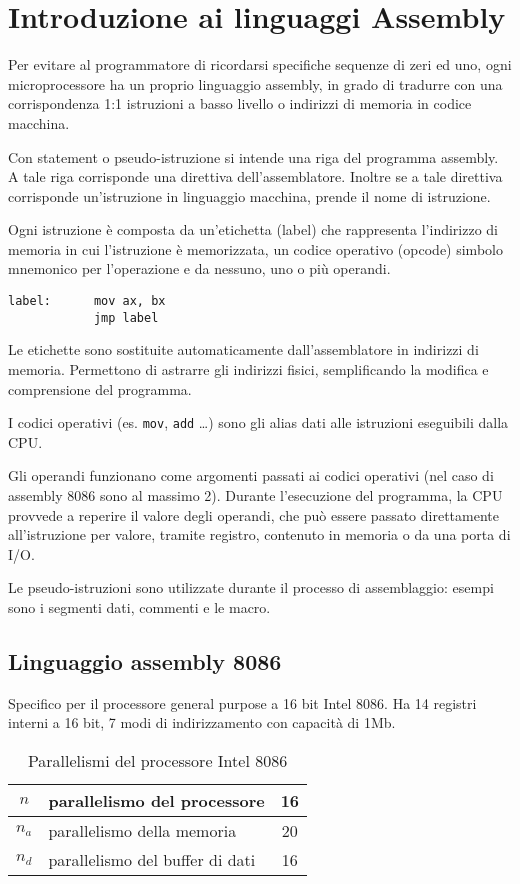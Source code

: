 \documentclass[../template]{subfiles}
\begin{document}
\section{Introduzione ai linguaggi Assembly}
Per evitare al programmatore di ricordarsi specifiche sequenze di zeri ed uno, ogni microprocessore ha un proprio
linguaggio assembly, in grado di tradurre con una corrispondenza 1:1 istruzioni a basso livello o indirizzi di memoria
in codice macchina.

Con statement o pseudo-istruzione si intende una riga del programma assembly. A tale riga corrisponde una direttiva
dell'assemblatore.  Inoltre se a tale direttiva corrisponde un'istruzione in linguaggio macchina, prende il nome di
istruzione.

Ogni istruzione è composta da un'etichetta (label) che rappresenta l'indirizzo di memoria in cui l'istruzione è
memorizzata, un codice operativo (opcode) simbolo mnemonico per l'operazione e da nessuno, uno o più operandi.

\begin{lstlisting}
label:      mov ax, bx
            jmp label
\end{lstlisting}

Le etichette sono sostituite automaticamente dall'assemblatore in indirizzi di memoria. Permettono di astrarre gli
indirizzi fisici, semplificando la modifica e comprensione del programma.

I codici operativi (es. \lstinline{mov}, \lstinline{add} \dots) sono gli alias dati alle istruzioni eseguibili dalla
CPU.

Gli operandi funzionano come argomenti passati ai codici operativi (nel caso di assembly 8086 sono al massimo 2).
Durante l'esecuzione del programma, la CPU provvede a reperire il valore degli operandi, che può essere passato
direttamente all'istruzione per valore, tramite registro, contenuto in memoria o da una porta di I/O.


Le pseudo-istruzioni sono utilizzate durante il processo di assemblaggio: esempi sono i segmenti dati, commenti  e le
macro.
\subsection{Linguaggio assembly 8086}
Specifico per il processore general purpose a 16 bit Intel 8086.
Ha 14 registri interni a 16 bit, 7 modi di indirizzamento con capacità di 1Mb.

\begin{table}[h]
    \centering
    \begin{tabu}{|c|l|c|}
        \hline
        $n$   & parallelismo del processore & 16\\
        \hline
        $n_a$ & parallelismo della memoria & 20\\
        \hline
        $n_d$ & parallelismo del buffer di dati & 16\\
        \hline
    \end{tabu}
    \caption{Parallelismi del processore Intel 8086}
\end{table}
\end{document}
